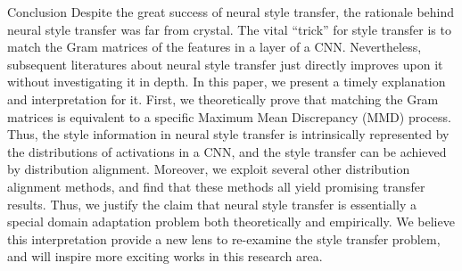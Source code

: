 \begin{section}{Conclusion}
Despite the great success of neural style transfer, the rationale behind neural style transfer was far from crystal. The vital ``trick'' for style transfer is to match the Gram matrices of the features in a layer of a CNN. Nevertheless, subsequent literatures about neural style transfer just directly improves upon it without investigating it in depth. In this paper, we present a timely explanation and interpretation for it. First, we theoretically prove that matching the Gram matrices is equivalent to a specific Maximum Mean Discrepancy (MMD) process. Thus, the style information in neural style transfer is intrinsically represented by the  distributions of activations in a CNN, and the style transfer can be achieved by distribution alignment. Moreover, we exploit several other distribution alignment methods, and find that these methods all yield promising transfer results. Thus, we justify the claim that neural style transfer is essentially a special domain adaptation problem both theoretically and empirically. We believe this interpretation provide a new lens to re-examine the style transfer problem, and will inspire more exciting works in this research area.



\end{section}